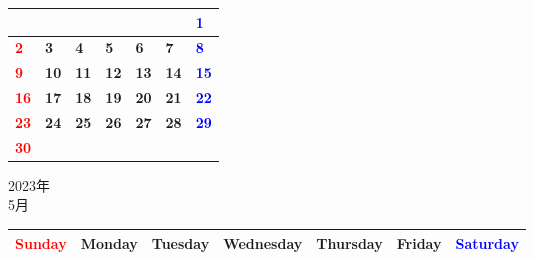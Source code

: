 \documentclass[a4paper,landscape]{jsarticle}
\newcommand{\dig}{\hspace{29mm}}
\newcommand{\tdig}{\hspace{27mm}}
\newcommand{\LBF}{\LARGE\textbf}
\begin{document}
\begingroup
\renewcommand{\arraystretch}{4}
\begin{tabular}{|p{32mm}|p{32mm}|p{32mm}|p{32mm}|p{32mm}|p{32mm}|p{32mm}|}
\hline
&&&&&&\raisebox{30pt} {\dig\textcolor{blue}{\LBF{1}}}\\
\hline
\raisebox{30pt} {\dig\textcolor{red}{\LBF{2}}}&\raisebox{30pt} {\dig\LBF{3}}&\raisebox{30pt} {\dig\LBF{4}}&\raisebox{30pt} {\dig\LBF{5}}&\raisebox{30pt} {\dig\LBF{6}}&\raisebox{30pt} {\dig\LBF{7}}&\raisebox{30pt} {\dig\textcolor{blue}{\LBF{8}}}\\
\hline
\raisebox{30pt} {\dig\textcolor{red}{\LBF{9}}}&\raisebox{30pt} {\tdig\LBF{10}}&\raisebox{30pt} {\tdig\LBF{11}}&\raisebox{30pt} {\tdig\LBF{12}}&\raisebox{30pt} {\tdig\LBF{13}}&\raisebox{30pt} {\tdig\LBF{14}}&\raisebox{30pt} {\tdig\textcolor{blue}{\LBF{15}}}\\
\hline
\raisebox{30pt} {\tdig\textcolor{red}{\LBF{16}}}&\raisebox{30pt} {\tdig\LBF{17}}&\raisebox{30pt} {\tdig\LBF{18}}&\raisebox{30pt} {\tdig\LBF{19}}&\raisebox{30pt} {\tdig\LBF{20}}&\raisebox{30pt} {\tdig\LBF{21}}&\raisebox{30pt} {\tdig\textcolor{blue}{\LBF{22}}}\\
\hline
\raisebox{30pt} {\tdig\textcolor{red}{\LBF{23}}}&\raisebox{30pt} {\tdig\LBF{24}}&\raisebox{30pt} {\tdig\LBF{25}}&\raisebox{30pt} {\tdig\LBF{26}}&\raisebox{30pt} {\tdig\LBF{27}}&\raisebox{30pt} {\tdig\LBF{28}}&\raisebox{30pt} {\tdig\textcolor{blue}{\LBF{29}}}\\
\hline
\raisebox{30pt} {\tdig\textcolor{red}{\LBF{30}}}&&&&&&\\
\hline
\end{tabular}
\endgroup

\newpage

\begin{center}
	\LARGE 2023年\\
	\LARGE 5月
\end{center}

\begingroup
\renewcommand{\arraystretch}{1.4}
\begin{tabular}{|>{\centering\arraybackslash}p{32mm}|>{\centering\arraybackslash}p{32mm}|>{\centering\arraybackslash}p{32mm}|>{\centering\arraybackslash}p{32mm}|>{\centering\arraybackslash}p{32mm}|>{\centering\arraybackslash}p{32mm}|>{\centering\arraybackslash}p{32mm}|}
\hline
\textcolor{red}{\large Sunday}&\large Monday&\large Tuesday&\large Wednesday&\large Thursday&\large Friday&\textcolor{blue}{\large Saturday}\\
\hline
\end{tabular}
\endgroup
\end{document}
